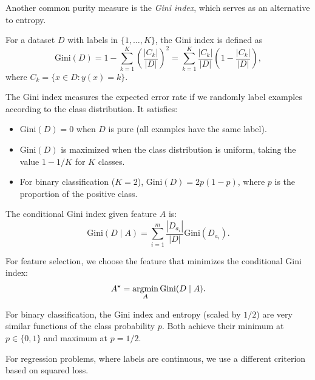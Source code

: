 \documentclass[../main]{subfiles}
\begin{document}
Another common purity measure is the \emph{Gini index}, which serves as an alternative to entropy.

\begin{definition}
    For a dataset $D$ with labels in $\{1,\ldots,K\}$, the Gini index is defined as
    \begin{equation}
        \mathrm{Gini}(D)
        = 1 - \sum_{k=1}^K \left(\frac{|C_k|}{|D|}\right)^2
        = \sum_{k=1}^K \frac{|C_k|}{|D|}\left(1 - \frac{|C_k|}{|D|}\right),
    \end{equation}
    where $C_k = \{x \in D : y(x) = k\}$.
\end{definition}

The Gini index measures the expected error rate if we randomly label examples according to the class distribution.  It satisfies:
\begin{itemize}
    \item $\mathrm{Gini}(D) = 0$ when $D$ is pure (all examples have the same label).
    \item $\mathrm{Gini}(D)$ is maximized when the class distribution is uniform, taking the value $1 - 1/K$ for $K$ classes.
    \item For binary classification ($K=2$), $\mathrm{Gini}(D) = 2p(1-p)$, where $p$ is the proportion of the positive class.
\end{itemize}

The conditional Gini index given feature $A$ is:
\begin{equation}
    \mathrm{Gini}(D \mid A)
    = \sum_{i=1}^m \frac{|D_{a_i}|}{|D|} \mathrm{Gini}(D_{a_i}).
\end{equation}

For feature selection, we choose the feature that minimizes the conditional Gini index:
\begin{equation}
    A^\star = \mathop{\mathrm{argmin}}_A \mathrm{Gini}(D \mid A).
\end{equation}

\begin{remark}
    For binary classification, the Gini index and entropy (scaled by $1/2$) are very similar functions of the class probability $p$.  Both achieve their minimum at $p \in \{0,1\}$ and maximum at $p = 1/2$.
\end{remark}

For regression problems, where labels are continuous, we use a different criterion based on squared loss.
\end{document}

